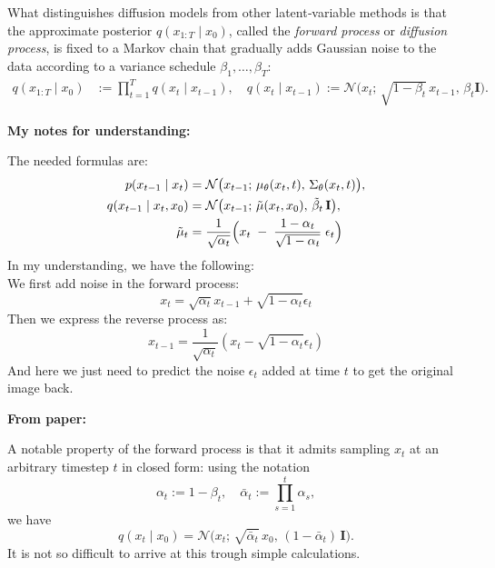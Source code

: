 \documentclass[12pt,a4paper]{article}
\begin{document}
What distinguishes diffusion models from other latent‐variable methods is
that the approximate posterior \(q(x_{1:T}\mid x_0)\), called the
\emph{forward process} or \emph{diffusion process}, is fixed to a Markov chain
that gradually adds Gaussian noise to the data according to a variance schedule
\(\beta_1,\dots,\beta_T\):
\begin{align}
  q(x_{1:T}\mid x_0)
  &:= \prod_{t=1}^T q(x_t\mid x_{t-1}),
  \quad
  q(x_t\mid x_{t-1})
  := \mathcal{N}\!\bigl(x_t;\,\sqrt{1-\beta_t}\,x_{t-1},\,\beta_t\mathbf I\bigr).
  \tag{2}\label{eq:forward}
\end{align}
\begin{center}
    \large\textbf{My notes for understanding:}
\end{center}
The needed formulas are:
\begin{align}
    p(x_{t-1}\mid x_t)
    &= \mathcal{N}\bigl(x_{t-1};\,\mu_\theta(x_t,t),\,\Sigma_\theta(x_t,t)\bigr),\\
    q(x_{t-1}\mid x_t, x_0)
    &= \mathcal{N}\bigl(x_{t-1};\,\tilde{\mu}(x_t,x_0),\,\tilde{\beta}_t\,\mathbf{I}\bigr),\\
    \tilde{\mu}_t
    &= \frac{1}{\sqrt{\alpha_t}}
       \Bigl(
         x_t \;-\;\frac{1 - \alpha_t}{\sqrt{1 - {\alpha}_t}}\;\epsilon_t
       \Bigr)
    \end{align}
In my understanding, we have the following:
\\
We first add noise in the forward process:
\begin{equation*}
    x_t = \sqrt{\alpha_t} x_{t-1} + \sqrt{1 - \alpha_t} \epsilon_t
\end{equation*}
Then we express the reverse process as:
\begin{equation*}
    x_{t-1} = \frac{1}{\sqrt{\alpha_t}} \left( x_t - \sqrt{1 - \alpha_t} \epsilon_t \right)
\end{equation*}
And here we just need to predict the noise \(\epsilon_t\) added at time \(t\) to get the original image back.
\\
\begin{center}
    \large\textbf{From paper:}
\end{center}
A notable property of the forward process is that it admits sampling \(x_t\) at an arbitrary timestep \(t\) in closed form: using the notation
\[
  \alpha_t := 1 - \beta_t,
  \quad
  \bar\alpha_t := \prod_{s=1}^t \alpha_s,
\]
we have
\begin{equation}\label{eq:q_xt_given_x0}
  q(x_t \mid x_0)
  = \mathcal{N}\!\bigl(x_t;\,\sqrt{\bar\alpha_t}\,x_0,\,(1 - \bar\alpha_t)\,\mathbf{I}\bigr).
\tag{4}
\end{equation}
It is not so difficult to arrive at this trough simple calculations.
\end{document}
